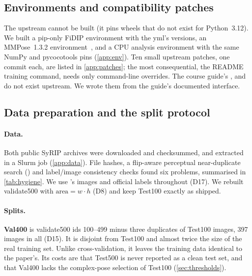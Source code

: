 \subsection{Environments and compatibility patches}\label{sec:env}

The upstream  cannot be built (it pins wheels that do not exist for Python~3.12). We built a pip-only FiDIP environment with the yml's versions, an MMPose~1.3.2 environment~\citep{mmpose2020}, and a CPU analysis environment with the same NumPy and pycocotools pins (\cref{app:env}).
Ten small upstream patches, one commit each, are listed in \cref{app:patches}; the most consequential, the README training command, needs only command-line overrides.
The course guide's ,  and  do not exist upstream. We wrote them from the guide's documented interface.

\subsection{Data preparation and the split protocol}\label{sec:data}

\paragraph{Data.} Both public SyRIP archives were downloaded and checksummed, and extracted in a Slurm job (\cref{app:data}). File hashes, a flip-aware perceptual near-duplicate search () and label/image consistency checks found six problems, summarised in \cref{tab:hygiene}.
We use 's images and official  labels throughout (D17). We rebuilt validate500 with $\text{area}=w\cdot h$ (D8) and keep Test100 exactly as shipped.

\paragraph{Splits.} \textbf{Val400} is validate500 ids 100--499 minus three duplicates of Test100 images, 397 images in all (D15). It is disjoint from Test100 and almost twice the size of the real training set. Unlike cross-validation, it leaves the training data identical to the paper's.
Its costs are that Test500 is never reported as a clean test set, and that Val400 lacks the complex-pose selection of Test100 (\cref{sec:thresholds}).

